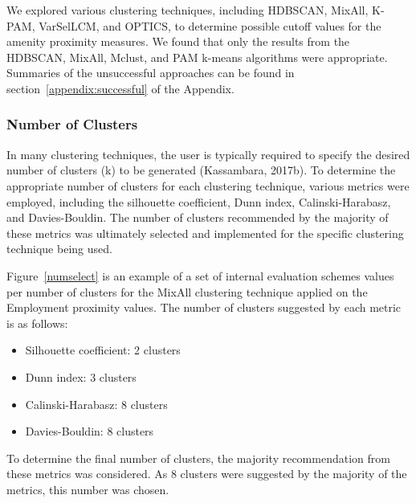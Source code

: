 \documentclass[11pt, a4paper]{article}
\begin{document}
We explored various clustering techniques, including HDBSCAN, MixAll, K-PAM, VarSelLCM, and OPTICS, to determine possible cutoff values for the amenity proximity measures. We found that only the results from the HDBSCAN, MixAll, Mclust, and PAM k-means algorithms were appropriate. Summaries of the unsuccessful approaches can be found in section~\ref{appendix:successful} of the Appendix.





\subsubsection{Number of Clusters}

In many clustering techniques, the user is typically required to specify the desired number of clusters (k) to be generated (Kassambara, 2017b). To determine the appropriate number of clusters for each clustering technique, various metrics were employed, including the silhouette coefficient, Dunn index, Calinski-Harabasz, and Davies-Bouldin. The number of clusters recommended by the majority of these metrics was ultimately selected and implemented for the specific clustering technique being used. 
\par
Figure~\ref{numselect} is an example of a set of internal evaluation schemes values per number of clusters for the MixAll clustering technique applied on the Employment proximity values. The number of clusters suggested by each metric is as follows:
\begin{itemize}
\item Silhouette coefficient: 2 clusters
\item Dunn index: 3 clusters
\item Calinski-Harabasz: 8 clusters
\item Davies-Bouldin: 8 clusters
\end{itemize}
To determine the final number of clusters, the majority recommendation from these metrics was considered. As 8 clusters were suggested by the majority of the metrics, this number was chosen.
\end{document}
